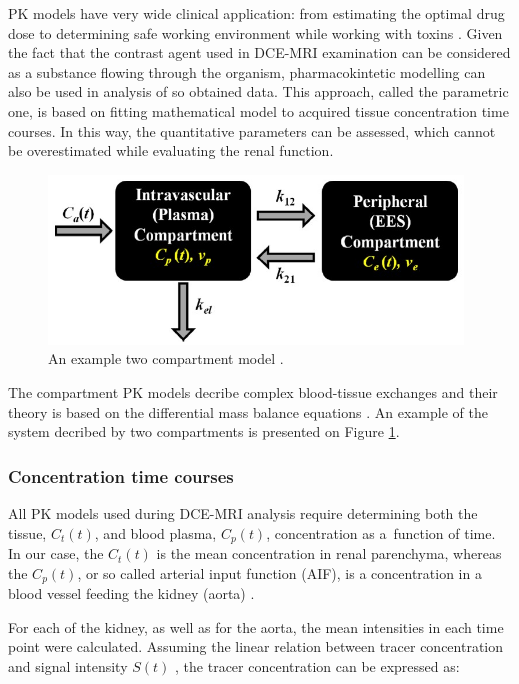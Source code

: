 PK models have very wide clinical application: from estimating the optimal drug dose to determining safe working environment while working with toxins  \cite{gerlowski1983physiologically}.
Given the fact that the contrast agent used in DCE-MRI examination can be considered as a substance flowing through the organism, pharmacokintetic modelling can also be used in analysis of so obtained data.   
This approach, called the parametric one, is based on fitting mathematical model to acquired tissue concentration time courses. In this way, the quantitative parameters can be assessed, which cannot be overestimated while evaluating the renal function. 
 

\begin{figure}[t]
	\centering
	\includegraphics[width = 11cm]{img/diagram2}
	\caption{An example two compartment model \cite{khalifa2014models}.}
	\label{fig:diagram2}
\end{figure}

The compartment PK models decribe complex blood-tissue exchanges and their theory is based on the differential mass balance equations \cite{sourbron2011tracer}. 
An example of the system decribed by two compartments is presented on Figure \ref{fig:diagram2}.


\subsubsection{Concentration time courses}
  

All PK models used during DCE-MRI analysis require determining both the tissue, $C_t(t)$, and blood plasma, $C_p(t)$, concentration as a~function of time. In our case, the $C_t(t)$ is the mean concentration in renal parenchyma, whereas the
$C_p(t)$, or so called arterial input function (AIF), is a concentration in a blood vessel feeding the kidney (aorta) \cite{khalifa2014models}.  

For each of the kidney, as well as for the aorta, the mean intensities in each time point were calculated. Assuming the linear relation between tracer concentration and signal intensity $S(t)$ \cite{lim2013prediction}, the tracer concentration can be expressed as:


